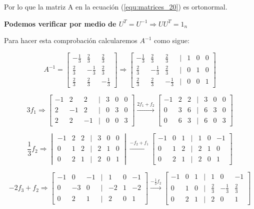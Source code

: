 \documentclass{article}
\begin{document}
\begin{enumerate}
Por lo que la matriz A en la ecuación (\ref{equ:matrices_20}) es ortonormal.

\vspace{0.5cm}

\textbf{Podemos verificar por medio de $U^T = U^{-1} \Rightarrow UU^T = 1_n$}

Para hacer esta comprobación calcularemos $A^{-1}$ como sigue: 

\[
A^{-1} = \begin{bmatrix}
-\frac{1}{3} & \frac{2}{3} & \frac{2}{3} \\
\frac{2}{3} & -\frac{1}{3} & \frac{2}{3} \\
\frac{2}{3} & \frac{2}{3} & -\frac{1}{3}
\end{bmatrix} \Rightarrow
\begin{bmatrix}
-\frac{1}{3} & \frac{2}{3} & \frac{2}{3} &| & 1 & 0 & 0\\
\frac{2}{3} & -\frac{1}{3} & \frac{2}{3} &| & 0 & 1 & 0\\
\frac{2}{3} & \frac{2}{3} & -\frac{1}{3} &| & 0 & 0 & 1
\end{bmatrix}
\]

\[
3f_1 \Rightarrow
\begin{bmatrix}
-1 & 2 & 2 & | & 3 & 0 & 0\\
2 & -1 & 2 & | &0 & 3 & 0\\
2 & 2 & -1 & | &0 & 0 & 3
\end{bmatrix}
\xrightarrow{2f_1+f_2}
\begin{bmatrix}
-1 & 2 & 2 & | &3 & 0 & 0\\
0 & 3 & 6 & | & 6 & 3 & 0\\
0 & 6 & 3 & | & 6 & 0 & 3
\end{bmatrix}
\]

\[
\frac{1}{3}f_2 \Rightarrow
\begin{vmatrix}
-1 & 2 & 2 & | & 3 & 0 & 0\\
0 & 1 & 2 & | & 2 & 1 & 0\\
0 & 2 & 1 & | & 2 & 0 & 1
\end{vmatrix}
\xrightarrow{-f_2+f_1}
\begin{bmatrix}
-1 & 0 & 1 & | &1 & 0 & -1\\
0 & 1 & 2 & | & 2 & 1 & 0\\
0 & 2 & 1 & | & 2 & 0 & 1
\end{bmatrix}
\]

\[
-2f_3+f_2 \Rightarrow
\begin{bmatrix}
-1 & 0 & -1 & | & 1 & 0 & -1\\
0 & -3 & 0 & | & -2 & 1 & -2\\
0 & 2 & 1 & | & 2 & 0 & 1
\end{bmatrix}
\xrightarrow{-\frac{1}{3}f_2}
\begin{bmatrix}
-1 & 0 & 1 & | & 1 & 0 & -1\\
0 & 1 & 0 & | & \frac{2}{3} & -\frac{1}{3} & \frac{2}{3}\\
0 & 2 & 1 & | & 2 & 0 & 1
\end{bmatrix}
\]


\end{enumerate}
\end{document}
